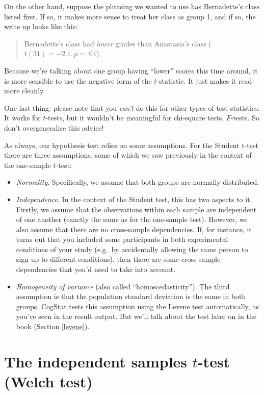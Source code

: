 \documentclass[
]{book}
\providecommand{\tightlist}{%
  \setlength{\itemsep}{0pt}\setlength{\parskip}{0pt}}
\theoremstyle{definition}
\theoremstyle{definition}
\theoremstyle{definition}
\theoremstyle{definition}
\theoremstyle{remark}
\begin{document}
On the other hand, suppose the phrasing we wanted to use has Bernadette's class listed first. If so, it makes more sense to treat her class as group 1, and if so, the write up looks like this:

\begin{quote}
Bernadette's class had \emph{lower} grades than Anastasia's class (\(t(31)= -2.1, p=.04\)).
\end{quote}

Because we're talking about one group having ``lower'' scores this time around, it is more sensible to use the negative form of the \(t\)-statistic. It just makes it read more cleanly.

One last thing: please note that you \emph{can't} do this for other types of test statistics. It works for \(t\)-tests, but it wouldn't be meaningful for chi-square tests, \(F\)-tests. So don't overgeneralise this advice!

As always, our hypothesis test relies on some assumptions. For the Student t-test there are three assumptions, some of which we saw previously in the context of the one-sample \(t\)-test:

\begin{itemize}
\tightlist
\item
  \emph{Normality}. Specifically, we assume that both groups are normally distributed.
\item
  \emph{Independence}. In the context of the Student test, this has two aspects to it. Firstly, we assume that the observations within each sample are independent of one another (exactly the same as for the one-sample test). However, we also assume that there are no cross-sample dependencies. If, for instance, it turns out that you included some participants in both experimental conditions of your study (e.g.~by accidentally allowing the same person to sign up to different conditions), then there are some cross sample dependencies that you'd need to take into account.
\item
  \emph{Homogeneity of variance} (also called ``homoscedasticity''). The third assumption is that the population standard deviation is the same in both groups. CogStat tests this assumption using the Levene test automatically, as you've seen in the result output. But we'll talk about the test later on in the book (Section \ref{levene}).
\end{itemize}

\hypertarget{welchttest}{%
\section{\texorpdfstring{The independent samples \(t\)-test (Welch test)}{The independent samples t-test (Welch test)}}\label{welchttest}}
\end{document}
